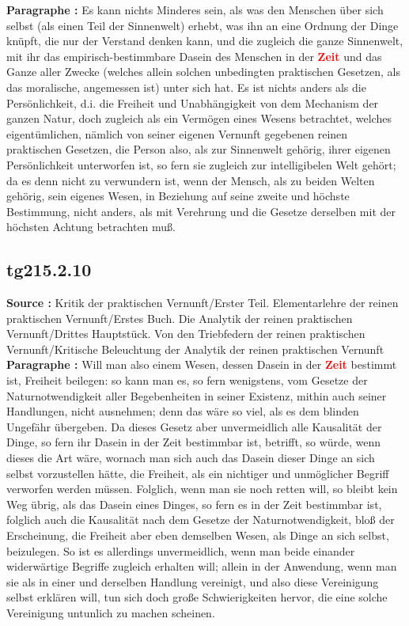 \documentclass[a4paper,12pt,twoside]{book}
\newcommand{\match}[1]{\textcolor{red}{\textbf{#1}}}
\begin{document}
	\noindent\textbf{Paragraphe : }Es kann nichts Minderes sein, als was den Menschen über sich selbst (als einen Teil der Sinnenwelt) erhebt, was ihn an eine Ordnung der Dinge knüpft, die nur der Verstand denken kann, und die zugleich die ganze Sinnenwelt, mit ihr das empirisch-bestimmbare Dasein des Menschen in der  \match{Zeit} und das Ganze aller Zwecke (welches allein solchen unbedingten praktischen Gesetzen, als das moralische, angemessen ist) unter sich hat. Es ist nichts anders als die Persönlichkeit, d.i. die Freiheit und Unabhängigkeit von dem Mechanism der ganzen Natur, doch zugleich als ein Vermögen eines Wesens betrachtet, welches eigentümlichen, nämlich von seiner eigenen Vernunft gegebenen reinen praktischen Gesetzen, die Person also, als zur Sinnenwelt gehörig, ihrer eigenen Persönlichkeit unterworfen ist, so fern sie zugleich zur intelligibelen Welt gehört; da es denn nicht zu verwundern ist, wenn der Mensch, als zu beiden Welten gehörig, sein eigenes Wesen, in Beziehung auf seine zweite und höchste Bestimmung, nicht anders, als mit Verehrung und die Gesetze derselben mit der höchsten Achtung betrachten muß. 
	
	\subsection*{tg215.2.10} 
	\textbf{Source : }Kritik der praktischen Vernunft/Erster Teil. Elementarlehre der reinen praktischen Vernunft/Erstes Buch. Die Analytik der reinen praktischen Vernunft/Drittes Hauptstück. Von den Triebfedern der reinen praktischen Vernunft/Kritische Beleuchtung der Analytik der reinen praktischen Vernunft\\  
	
	\noindent\textbf{Paragraphe : }Will man also einem Wesen, dessen Dasein in der \match{Zeit} bestimmt ist, Freiheit beilegen: so kann man es, so fern wenigstens, vom Gesetze der Naturnotwendigkeit aller Begebenheiten in seiner Existenz, mithin auch seiner Handlungen, nicht ausnehmen; denn das wäre so viel, als es dem blinden Ungefähr übergeben. Da dieses Gesetz aber unvermeidlich alle Kausalität der Dinge, so fern ihr Dasein in der Zeit bestimmbar ist, betrifft, so würde, wenn dieses die Art wäre, wornach man sich auch das Dasein dieser Dinge an sich selbst vorzustellen hätte, die Freiheit, als ein nichtiger und unmöglicher Begriff verworfen werden müssen. Folglich, wenn man sie noch retten will, so bleibt kein Weg übrig, als das Dasein eines Dinges, so fern es in der Zeit bestimmbar ist, folglich auch die Kausalität nach dem Gesetze der Naturnotwendigkeit, bloß der Erscheinung, die Freiheit aber eben demselben Wesen, als Dinge an sich selbst, beizulegen. So ist es allerdings unvermeidlich, wenn man beide einander widerwärtige Begriffe zugleich erhalten will; allein in der Anwendung, wenn man sie als in einer und derselben Handlung vereinigt, und also diese Vereinigung selbst erklären will, tun sich doch große Schwierigkeiten hervor, die eine solche Vereinigung untunlich zu machen scheinen. 
	
\end{document}
